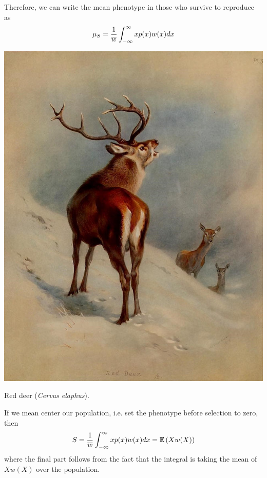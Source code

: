 Therefore, we can write the mean phenotype in those who survive to
reproduce as
\begin{equation}
\mu_S = \frac{1}{\overline{w}}\int_{-\infty}^{\infty} x p(x) w(x) dx
\end{equation}
\begin{marginfigure}
  \begin{center}
    \includegraphics[width= \textwidth]{illustration_images/Quant_gen/red_deer/Red_deer.png}
\end{center}
\caption{Red deer ({\it Cervus elaphus}). } \label{fig:red_deer}  
\end{marginfigure}

If we mean center our population, i.e. set the phenotype before
selection to zero, then
\begin{equation}
S= \frac{1}{\overline{w}}\int_{-\infty}^{\infty} x p(x) w(x) dx = \mathbb{E} \left (X
  w(X) \right)
\end{equation}
where the final part follows from the fact that the integral is taking
the mean of $X w(X)$ over the population.

